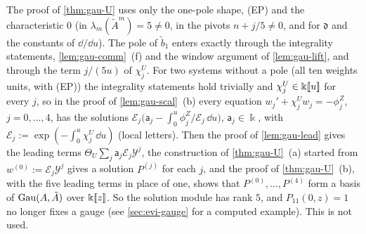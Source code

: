 \begin{rmk}
\label{rmk:gau-Uremarks}
The proof of \cref{thm:gau-U} uses only the one-pole shape, (EP) and the characteristic $0$ (in $\lambda_m(\tilde A^m)=5\neq0$, in the pivots $n+j/5\neq0$, and for $\mathfrak d$ and the constants of $\dd/\dd u$). The pole of $\tilde b_1$ enters exactly through the integrality statements, \cref{lem:gau-comm}~(f) and the window argument of \cref{lem:gau-lift}, and through the term $j/(5u)$ of $\chi^U_j$. For two systems without a pole (all ten weights units, with (EP)) the integrality statements hold trivially and $\chi^U_j\in\Bbbk[\![ u ]\!]$ for every $j$, so in the proof of \cref{lem:gau-scal}~(b) every equation $w_j'+\chi^U_jw_j=-\phi^Z_j$, $j=0,\dots,4$, has the solutions $\mathcal E_j\bigl(\mathsf a_j-\int_0^u\phi^Z_j/\mathcal E_j\,\dd u\bigr)$, $\mathsf a_j\in\Bbbk$, with $\mathcal E_j:=\exp(-\int_0^u\chi^U_j\,\dd u)$ (local letters). Then the proof of \cref{lem:gau-lead} gives the leading terms $\Theta_U\sum_j\mathsf a_j\mathcal E_j\mathcal Y^j$, the construction of \cref{thm:gau-U}~(a) started from $w^{(0)}:=\mathcal E_j\mathcal Y^j$ gives a solution $P^{(j)}$ for each $j$, and the proof of \cref{thm:gau-U}~(b), with the five leading terms in place of one, shows that $P^{(0)},\dots,P^{(4)}$ form a basis of $\operatorname{Gau}(A,\tilde A)$ over $\Bbbk[\![ z ]\!]$. So the solution module has rank $5$, and $P_{11}(0,z)=1$ no longer fixes a gauge (see \cref{sec:evi-gauge} for a computed example). This is not used.
\end{rmk}



